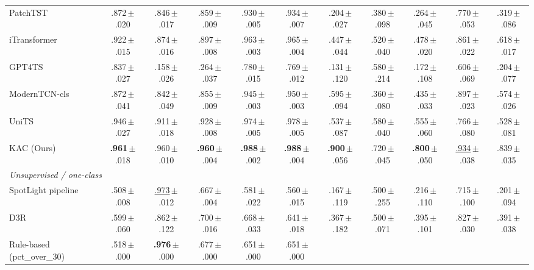 \documentclass[conference]{IEEEtran}
\newcommand{\sd}[1]{\,{\fontsize{6pt}{7pt}\selectfont $\pm$#1}}
\begin{document}
\begin{table}[t]
\begin{tabular*}{\textwidth}{@{\extracolsep{\fill}}l|ccccc|ccccc@{}}
    PatchTST~\cite{nie2023patchtst}              & .872\sd{.020} & .846\sd{.017} & .859\sd{.009} & .930\sd{.005} & .934\sd{.007}
                                                 & .204\sd{.027} & .380\sd{.098} & .264\sd{.045} & .770\sd{.053} & .319\sd{.086} \\
    iTransformer~\cite{liu2024itransformer}      & .922\sd{.015} & .874\sd{.016} & .897\sd{.008} & .963\sd{.003} & .965\sd{.004}
                                                 & .447\sd{.044} & .520\sd{.040} & .478\sd{.020} & .861\sd{.022} & .618\sd{.017} \\
    GPT4TS~\cite{zhou2023gpt4ts}                 & .837\sd{.027} & .158\sd{.026} & .264\sd{.037} & .780\sd{.015} & .769\sd{.012}
                                                 & .131\sd{.120} & .580\sd{.214} & .172\sd{.108} & .606\sd{.069} & .204\sd{.077} \\
    ModernTCN-cls~\cite{luo2024moderntcn}        & .872\sd{.041} & .842\sd{.049} & .855\sd{.009} & .945\sd{.003} & .950\sd{.003}
                                                 & .595\sd{.094} & .360\sd{.080} & .435\sd{.033} & .897\sd{.023} & .574\sd{.026} \\
    UniTS~\cite{gao2024units}                    & .946\sd{.027} & .911\sd{.018} & .928\sd{.008} & .974\sd{.005} & .978\sd{.005}
                                                 & .537\sd{.087} & .580\sd{.040} & .555\sd{.060} & .766\sd{.080} & .528\sd{.081} \\
    KAC (Ours)                                   & \textbf{.961}\sd{.018} & .960\sd{.010} & \textbf{.960}\sd{.004} & \textbf{.988}\sd{.002} & \textbf{.988}\sd{.004}
                                                 & \textbf{.900}\sd{.056} & .720\sd{.045} & \textbf{.800}\sd{.050} & \underline{.934}\sd{.038} & .839\sd{.035} \\
    \midrule
    \multicolumn{11}{l}{\emph{Unsupervised / one-class}} \\
    SpotLight pipeline~\cite{sun2024spotlight}   & .508\sd{.008} & \underline{.973}\sd{.012} & .667\sd{.004} & .581\sd{.022} & .560\sd{.015}
                                                 & .167\sd{.119} & .500\sd{.255} & .216\sd{.110} & .715\sd{.100} & .201\sd{.094} \\
    D3R~\cite{wang2023d3r}                       & .599\sd{.060} & .862\sd{.122} & .700\sd{.016} & .668\sd{.033} & .641\sd{.018}
                                                 & .367\sd{.182} & .500\sd{.071} & .395\sd{.101} & .827\sd{.030} & .391\sd{.038} \\
    Rule-based (pct\_over\_30)                   & .518\sd{.000} & \textbf{.976}\sd{.000} & .677\sd{.000} & .651\sd{.000} & .651\sd{.000}

\end{tabular*}
\end{table}
\end{document}
